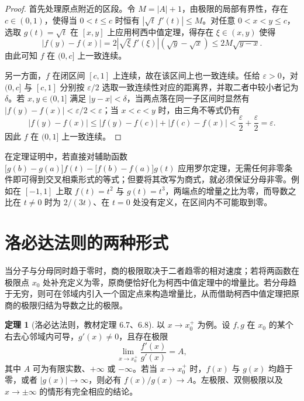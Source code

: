 \documentclass[UTF8,fontset=fandol,a4paper,12pt]{ctexart}
\theoremstyle{definition}
\newtheorem{theorem}{定理}[section]
\begin{document}
\begin{proof}
首先处理原点附近的区段。令 $M=|A|+1$，由极限的局部有界性，存在 $c\in(0,1)$，使得当 $0<t\le c$ 时恒有 $|\sqrt{t}\,f'(t)|\le M$。对任意 $0<x<y\le c$，选取 $g(t)=\sqrt{t}$ 在 $[x,y]$ 上应用柯西中值定理，得存在 $\xi\in(x,y)$ 使得
\[
 |f(y)-f(x)|=2|\sqrt{\xi}\,f'(\xi)|(\sqrt{y}-\sqrt{x})
 \le 2M\sqrt{y-x}.
\]
由此可知 $f$ 在 $(0,c]$ 上一致连续。

另一方面，$f$ 在闭区间 $[c,1]$ 上连续，故在该区间上也一致连续。任给 $\varepsilon>0$，对 $(0,c]$ 与 $[c,1]$ 分别按 $\varepsilon/2$ 选取一致连续性对应的距离界，并取二者中较小者记为 $\delta$。若 $x,y\in(0,1]$ 满足 $|y-x|<\delta$，当两点落在同一子区间时显然有 $|f(y)-f(x)|<\varepsilon/2<\varepsilon$；当 $x<c<y$ 时，由三角不等式仍有
\[
 |f(y)-f(x)|\le |f(y)-f(c)|+|f(c)-f(x)|<\frac{\varepsilon}{2}+\frac{\varepsilon}{2}=\varepsilon.
\]
因此 $f$ 在 $(0,1]$ 上一致连续。
\end{proof}

在定理证明中，若直接对辅助函数 $\bigl[g(b)-g(a)\bigr]f(t)-\bigl[f(b)-f(a)\bigr]g(t)$ 应用罗尔定理，无需任何非零条件即可得到交叉相乘形式的等式；但要将其改写为商式，就必须保证分母非零。例如在 $[-1,1]$ 上取 $f(t)=t^2$ 与 $g(t)=t^3$，两端点的增量之比为零，而导数之比在 $t\ne0$ 时为 $2/(3t)$、在 $t=0$ 处没有定义，在区间内不可能取到零。

\section{洛必达法则的两种形式}
当分子与分母同时趋于零时，商的极限取决于二者趋零的相对速度；若将两函数在极限点 $x_0$ 处补充定义为零，原商便恰好化为柯西中值定理中的增量比。若分母趋于无穷，则可在邻域内引入一个固定点来构造增量比，从而借助柯西中值定理把原商的极限归结为导数之比的极限。

\begin{theorem}[洛必达法则，教材定理 6.7、6.8]
以 $x\to x_0^+$ 为例。设 $f,g$ 在 $x_0$ 的某个右去心邻域内可导，$g'(x)\ne0$，且存在极限
\[
 \lim_{x\to x_0^+}\frac{f'(x)}{g'(x)}=A,
\]
其中 $A$ 可为有限实数、$+\infty$ 或 $-\infty$。若当 $x\to x_0^+$ 时，$f(x)$ 与 $g(x)$ 均趋于零，或者 $|g(x)|\to\infty$，则必有 $f(x)/g(x)\to A$。左极限、双侧极限以及 $x\to\pm\infty$ 的情形有完全相应的结论。
\end{theorem}
\end{document}
